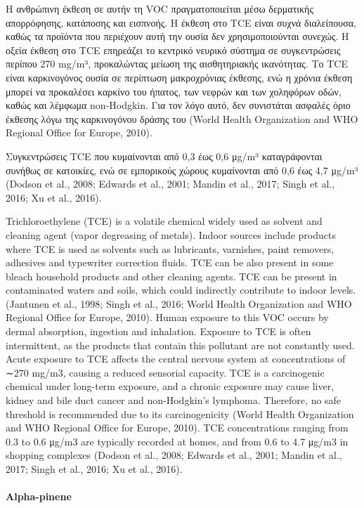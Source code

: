 Η ανθρώπινη έκθεση σε αυτήν τη VOC πραγματοποιείται μέσω δερματικής απορρόφησης, κατάποσης και εισπνοής. Η έκθεση στο TCE είναι συχνά διαλείπουσα, καθώς τα προϊόντα που περιέχουν αυτή την ουσία δεν χρησιμοποιούνται συνεχώς. Η οξεία έκθεση στο TCE επηρεάζει το κεντρικό νευρικό σύστημα σε συγκεντρώσεις περίπου 270 mg/m³, προκαλώντας μείωση της αισθητηριακής ικανότητας. Το TCE είναι καρκινογόνος ουσία σε περίπτωση μακροχρόνιας έκθεσης, ενώ η χρόνια έκθεση μπορεί να προκαλέσει καρκίνο του ήπατος, των νεφρών και των χοληφόρων οδών, καθώς και λέμφωμα non-Hodgkin. Για τον λόγο αυτό, δεν συνιστάται ασφαλές όριο έκθεσης λόγω της καρκινογόνου δράσης του (World Health Organization and WHO Regional Office for Europe, 2010).

Συγκεντρώσεις TCE που κυμαίνονται από 0,3 έως 0,6 μg/m³ καταγράφονται συνήθως σε κατοικίες, ενώ σε εμπορικούς χώρους κυμαίνονται από 0,6 έως 4,7 μg/m³ (Dodson et al., 2008; Edwards et al., 2001; Mandin et al., 2017; Singh et al., 2016; Xu et al., 2016).

Trichloroethylene (TCE) is a volatile chemical widely used as solvent and cleaning agent (vapor degreasing of metals). Indoor sources include products where TCE is used as solvents such as lubricants, varnishes, paint removers, adhesives and typewriter correction fluids. TCE can be also present in some bleach household products and other cleaning agents. TCE can be present in contaminated waters and soils, which could indirectly contribute to indoor levels. (Jantunen et al., 1998; Singh et al., 2016; World Health Organization and WHO Regional Office for Europe, 2010). Human exposure to this VOC occurs by dermal absorption, ingestion and inhalation. Exposure to TCE is often intermittent, as the products that contain this pollutant are not constantly used. Acute exposure to TCE affects the central nervous system at concentrations of ∼270 mg/m3, causing a reduced sensorial capacity. TCE is a carcinogenic chemical under long-term exposure, and a chronic exposure may cause liver, kidney and bile duct cancer and non-Hodgkin’s lymphoma. Therefore, no safe threshold is recommended due to its carcinogenicity (World Health Organization and WHO Regional Office for Europe, 2010). TCE concentrations ranging from 0.3 to 0.6 μg/m3 are typically recorded at homes, and from 0.6 to 4.7 μg/m3 in shopping complexes (Dodson et al., 2008; Edwards et al., 2001; Mandin et al., 2017; Singh et al., 2016; Xu et al., 2016).

\paragraph{Alpha-pinene }

